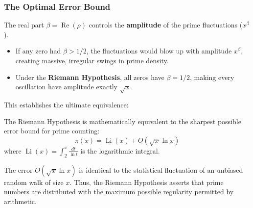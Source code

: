 \documentclass[a4paper]{article}
\begin{document}
\subsubsection{The Optimal Error Bound}
The real part $\beta = \operatorname{Re}(\rho)$ controls the \textbf{amplitude} of the prime fluctuations ($x^\beta$). 
\begin{itemize}
    \item If any zero had $\beta > 1/2$, the fluctuations would blow up with amplitude $x^\beta$, creating massive, irregular swings in prime density.
    \item Under the \textbf{Riemann Hypothesis}, all zeros have $\beta = 1/2$, making every oscillation have amplitude exactly $\sqrt{x}$.
\end{itemize}
This establishes the ultimate equivalence:
\begin{theorem}
The Riemann Hypothesis is mathematically equivalent to the sharpest possible error bound for prime counting:
\begin{equation}
    \label{zf:eq:pnt-rh-error}
    \boxed{
        \pi(x) = \operatorname{Li}(x) + O\left(\sqrt{x} \ln x\right)
    }
\end{equation}
where $\operatorname{Li}(x) = \int_2^x \frac{dt}{\ln t}$ is the logarithmic integral.
\end{theorem}
The error $O(\sqrt{x} \ln x)$ is identical to the statistical fluctuation of an unbiased random walk of size $x$. Thus, the Riemann Hypothesis asserts that prime numbers are distributed with the maximum possible regularity permitted by arithmetic.
\end{document}
